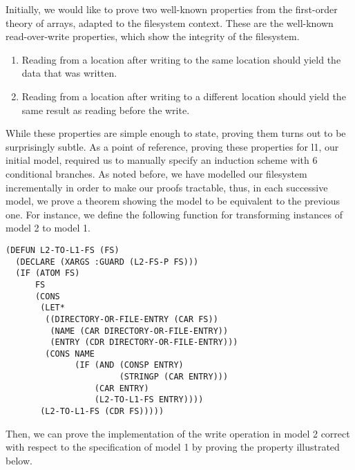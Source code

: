 \documentclass[format=sigconf,review=true]{acmart}
\begin{document}
Initially, we would like to prove two well-known properties from the
first-order theory of arrays, adapted to the filesystem context. These
are the well-known read-over-write properties, which show the
integrity of the filesystem.

\begin {enumerate}
\item Reading from a location after writing to the same location
  should yield the data that was written.
\item Reading from a location after writing to a different
  location should yield the same result as reading before the write.
\end {enumerate}

While these properties are simple enough to state, proving them turns
out to be surprisingly subtle. As a point of reference, proving these
properties for l1, our initial model, required us to manually specify
an induction scheme with 6 conditional branches. As noted
before, we have modelled our filesystem incrementally in order to make
our proofs tractable, thus, in each successive model, we prove a
theorem showing the model to be equivalent to the previous one. For
instance, we define the following function for transforming
instances of model 2 to model 1.

\begin{lstlisting}
(DEFUN L2-TO-L1-FS (FS)
  (DECLARE (XARGS :GUARD (L2-FS-P FS)))
  (IF (ATOM FS)
      FS
      (CONS
       (LET*
        ((DIRECTORY-OR-FILE-ENTRY (CAR FS))
         (NAME (CAR DIRECTORY-OR-FILE-ENTRY))
         (ENTRY (CDR DIRECTORY-OR-FILE-ENTRY)))
        (CONS NAME
              (IF (AND (CONSP ENTRY)
                       (STRINGP (CAR ENTRY)))
                  (CAR ENTRY)
                  (L2-TO-L1-FS ENTRY))))
       (L2-TO-L1-FS (CDR FS)))))
\end{lstlisting}

Then, we can prove the implementation of the write operation in model
2 correct with respect to the specification of model 1 by proving the
property illustrated below.

\end{document}
